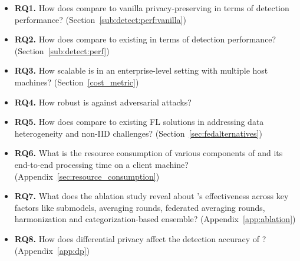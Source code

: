 


\begin{itemize}[leftmargin=*,itemsep=0.1em, parsep=0em, topsep=0em]
  \item \textbf{RQ1.} How does \Sys compare to vanilla privacy-preserving \pids in terms of detection performance? (Section~\ref{sub:detect:perf:vanilla})
  \item \textbf{RQ2.} How does \Sys compare to existing \pids in terms of detection performance? (Section~\ref{sub:detect:perf})
  \item \textbf{RQ3.} How scalable is \Sys in an enterprise-level setting with multiple host machines? (Section~\ref{cost_metric})
  \item \textbf{RQ4.} How robust is \Sys against adversarial attacks?
  \item \textbf{RQ5.} How does \Sys compare to existing FL solutions in addressing data heterogeneity and non-IID challenges? (Section~\ref{sec:fedalternatives})

  
  \item \textbf{RQ6.} What is the resource consumption of various components of \Sys and its end-to-end processing time on a client machine? (Appendix~\ref{sec:resource_consumption})
  \item \textbf{RQ7.} What does the ablation study reveal about \Sys's effectiveness across key factors like \gnnshort submodels, averaging rounds, federated averaging rounds, \wordvec harmonization and categorization-based \gnnshort ensemble? (Appendix~\ref{app:ablation})
  \item \textbf{RQ8.} How does differential privacy affect the detection accuracy of \Sys? (Appendix~\ref{app:dp})
  
  \end{itemize}  


